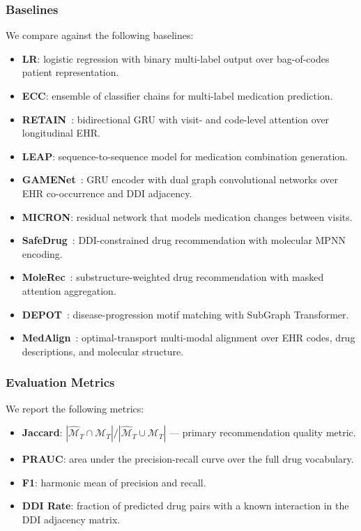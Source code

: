 \documentclass[sigconf,anonymous]{acmart}
\begin{document}
\subsubsection{Baselines}
We compare against the following baselines:
\begin{itemize}
  \item \textbf{LR}: logistic regression with binary multi-label output over bag-of-codes patient representation.
  \item \textbf{ECC}: ensemble of classifier chains for multi-label medication prediction.
  \item \textbf{RETAIN}~\cite{retain}: bidirectional GRU with visit- and code-level attention over longitudinal EHR.
  \item \textbf{LEAP}: sequence-to-sequence model for medication combination generation.
  \item \textbf{GAMENet}~\cite{gamenet}: GRU encoder with dual graph convolutional networks over EHR co-occurrence and DDI adjacency.
  \item \textbf{MICRON}: residual network that models medication changes between visits.
  \item \textbf{SafeDrug}~\cite{safedrug}: DDI-constrained drug recommendation with molecular MPNN encoding.
  \item \textbf{MoleRec}~\cite{molerec}: substructure-weighted drug recommendation with masked attention aggregation.
  \item \textbf{DEPOT}~\cite{depot}: disease-progression motif matching with SubGraph Transformer.
  \item \textbf{MedAlign}~\cite{medalign}: optimal-transport multi-modal alignment over EHR codes, drug descriptions, and molecular structure.
\end{itemize}

\subsubsection{Evaluation Metrics}
We report the following metrics:
\begin{itemize}
  \item \textbf{Jaccard}: $|\hat{\mathcal{M}}_T \cap \mathcal{M}_T| / |\hat{\mathcal{M}}_T \cup \mathcal{M}_T|$ — primary recommendation quality metric.
  \item \textbf{PRAUC}: area under the precision-recall curve over the full drug vocabulary.
  \item \textbf{F1}: harmonic mean of precision and recall.
  \item \textbf{DDI Rate}: fraction of predicted drug pairs with a known interaction in the DDI adjacency matrix.
\end{itemize}
\end{document}
